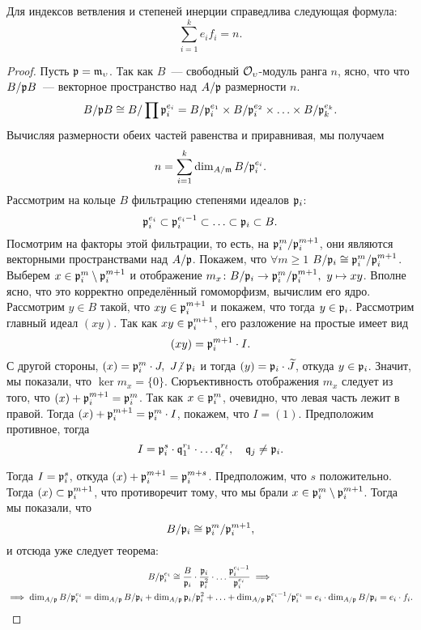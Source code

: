 	\begin{theorem} 
		Для индексов ветвления и степеней инерции справедлива следующая формула: 
		\[
			\sum_{i = 1}^{k} e_i f_i = n.
		\]
	\end{theorem}
	\begin{proof}
		Пусть $\mathfrak{p} = \mathfrak{m}_{\upsilon}$. Так как $B$~--- свободный $\mathcal{O}_{\upsilon}$-модуль ранга $n$, ясно, что что $B/\mathfrak{p} B$~--- векторное пространство над $A/\mathfrak{p}$ размерности $n$. 
		\[
			B/\mathfrak{p} B \cong B/\prod \mathfrak{p}_i^{e_i} = B/\mathfrak{p}_{i}^{e_1} \times  B/\mathfrak{p}_{i}^{e_2} \times \ldots \times  B/\mathfrak{p}_{k}^{e_k}.
		\]
		Вычисляя размерности обеих частей равенства и приравнивая, мы получаем 
		\[
			n = \sum_{i = 1}^{k} \dim_{A/\mathfrak{m}} B/\mathfrak{p}_i^{e_i}.
		\]
		Рассмотрим на кольце $B$ фильтрацию степенями идеалов $\mathfrak{p}_i$:
		\[
			\mathfrak{p}_{i}^{e_i} \subset \mathfrak{p}_i^{e_i - 1} \subset \ldots \subset \mathfrak{p}_i \subset B.
		\]
		Посмотрим на факторы этой фильтрации, то есть, на  $\mathfrak{p}_{i}^{m}/\mathfrak{p}_{i}^{m + 1}$, они являются векторными пространствами над $A/\mathfrak{p}$. Покажем, что $\forall m \ge 1$ $B/\mathfrak{p}_i \cong \mathfrak{p}_i^m / \mathfrak{p}_i^{m + 1}$. Выберем $x \in \mathfrak{p}_i^{m}\setminus \mathfrak{p}_{i}^{m + 1}$ и отображение $m_{x}\colon B/\mathfrak{p}_i \to \mathfrak{p}_i^m/\mathfrak{p}_i^{m + 1}, \ y \mapsto xy$. Вполне ясно, что это корректно определённый гомоморфизм, вычислим его ядро.  Рассмотрим $y \in B$ такой, что $xy \in \mathfrak{p}_i^{m + 1}$ и покажем, что тогда $y \in \mathfrak{p}_i$. Рассмотрим главный идеал $(xy)$. Так как $xy \in \mathfrak{p}_i^{m + 1}$, его разложение на простые имеет вид 
		\[
			(xy) = \mathfrak{p}_i^{m + 1} \cdot I.
		\]
		С другой стороны, $(x) = \fp_i^{m} \cdot J, \ J \notdivby \fp_i$ и тогда  $(y) = \mathfrak{p}_i \cdot \widetilde{J}$, откуда $y \in \mathfrak{p}_i$. Значит, мы показали, что $\ker{m_{x}} = \{ 0\}$. Сюръективность отображения $m_{x}$ следует из того, что $(x) + \mathfrak{p}_{i}^{m + 1} = \mathfrak{p}_{i}^m$. Так как $x \in \mathfrak{p}_i^m$, очевидно, что левая часть лежит в правой. Тогда $(x) + \mathfrak{p}_{i}^{m + 1} =  \mathfrak{p}_i^m \cdot I$, покажем, что $I = (1)$. Предположим противное, тогда 
		\[
			I = \mathfrak{p}_i^{s} \cdot \mathfrak{q}_{1}^{r_1} \cdot \ldots \mathfrak{q}_{\ell}^{r_{\ell}}, \quad \mathfrak{q}_j \neq \mathfrak{p}_i.
		\]

		Тогда $I = \mathfrak{p}_{i}^{s}$, откуда $(x) + \mathfrak{p}_{i}^{m + 1} = \mathfrak{p}_{i}^{m + s}$. Предположим, что $s$ положительно. Тогда $(x) \subset \mathfrak{p}_i^{m + 1}$, что противоречит тому, что мы брали $x \in \mathfrak{p}_i^{m}\setminus \mathfrak{p}_{i}^{m + 1}$. Тогда мы показали, что 
		\[
			B/\mathfrak{p}_i \cong \mathfrak{p}_i^m/\mathfrak{p}_i^{m + 1},
		\]
		и отсюда уже следует теорема: 
		\begin{multline*}
			B/\mathfrak{p}_{i}^{e_i} \cong \frac{B}{\mathfrak{p}_{i}} \cdot \frac{\mathfrak{p}_i}{\mathfrak{p}_{i}^2}  \cdot \ldots \frac{\mathfrak{p}_i^{e_i - 1}}{\mathfrak{p}_{i}^{e_i}} \implies \\ \implies \dim_{A/\mathfrak{p}} B/\mathfrak{p}_i^{e_i} = \dim_{A/\mathfrak{p}}{B/\mathfrak{p}_i} + \dim_{A/\mathfrak{p}}{\mathfrak{p}_i/\mathfrak{p}_i^2} + \ldots + \dim_{A/\mathfrak{p}}{\mathfrak{p}_i^{e_i - 1}/\mathfrak{p}_i^{e_i}} = e_i \cdot \dim_{A/\mathfrak{p}}{B/\mathfrak{p}_i} = e_i \cdot f_i.  
		\end{multline*}
	\end{proof}
  






